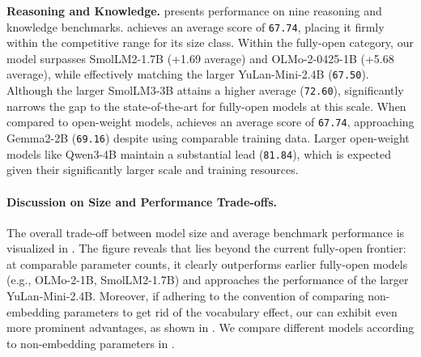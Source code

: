 \textbf{Reasoning and Knowledge.}
 presents performance on nine reasoning and knowledge benchmarks. \sys achieves an average score of \texttt{67.74}, placing it firmly within the competitive range for its size class. Within the fully-open category, our model surpasses SmolLM2-1.7B (+1.69 average) and OLMo-2-0425-1B (+5.68 average), while effectively matching the larger YuLan-Mini-2.4B (\texttt{67.50}). Although the larger SmolLM3-3B attains a higher average (\texttt{72.60}), \sys significantly narrows the gap to the state-of-the-art for fully-open models at this scale.
When compared to open-weight models, \sys achieves an average score of \texttt{67.74}, approaching Gemma2-2B (\texttt{69.16}) despite using comparable training data. 
Larger open-weight models like Qwen3-4B maintain a substantial lead (\texttt{81.84}), which is expected given their significantly larger scale and training resources.

\begin{table}[htbp]
\centering
\caption{Reasoning and Knowledge Capabilities.}
\label{tab:reasoning_knowledge}
\resizebox{\textwidth}{!}{%

}
\end{table}

\paragraph{Discussion on Size and Performance Trade-offs.} The overall trade-off between model size and average benchmark performance is visualized in . The figure reveals that \sys lies beyond the current fully-open frontier: at comparable parameter counts, it clearly outperforms earlier fully-open models (e.g., OLMo-2-1B, SmolLM2-1.7B) and approaches the performance of the larger YuLan-Mini-2.4B. Moreover, if adhering to the convention of comparing non-embedding parameters to get rid of the vocabulary effect, our \sys can exhibit even more prominent advantages, as shown in .
We compare different models according to non-embedding parameters in .

